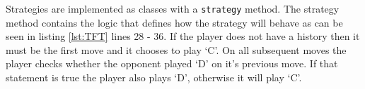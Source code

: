 Strategies are implemented as classes with a \texttt{strategy} method.
The strategy method contains the logic that defines how the strategy will behave as can be seen in listing \ref{lst:TFT} lines 28 - 36.
If the player does not have a history then it must be the first move and it chooses to play `C'.
On all subsequent moves the player checks whether the opponent played `D' on it's previous move.
If that statement is true the player also plays `D', otherwise it will play `C'.
